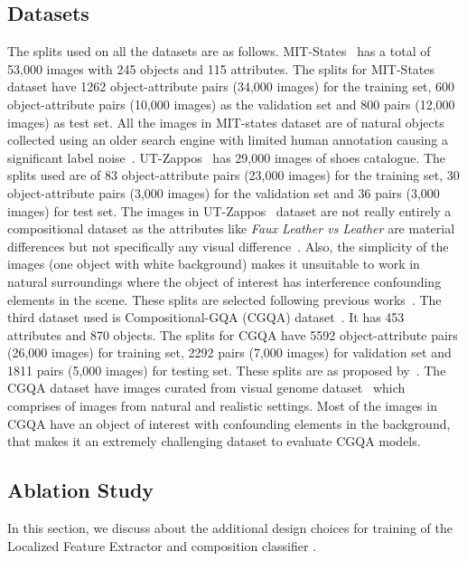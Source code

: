\documentclass{bmvc2k}
\begin{document}
\subsection{Datasets}
The splits used on all the datasets are as follows. MIT-States~\cite{isola2015discovering} has a total of 53,000 images with 245 objects and 115 attributes. The splits for MIT-States dataset have 1262 object-attribute pairs (34,000 images) for the training set, 600 object-attribute pairs (10,000 images) as the validation set and 800 pairs (12,000 images) as test set.  All the images in MIT-states dataset are of natural objects collected using an older search engine with limited human annotation causing a significant label noise~\cite{Atzmon_casual}.
UT-Zappos~\cite{yu2017semantic} has 29,000 images of shoes catalogue. The splits used are of 83 object-attribute pairs (23,000 images) for the training set, 30 object-attribute pairs (3,000 images) for the validation set and 36 pairs (3,000 images) for test set.  The images in UT-Zappos~\cite{yu2017semantic} dataset are not really entirely a compositional dataset as the attributes like \textit{Faux Leather vs Leather} are material differences but not specifically any visual difference~\cite{mancini2021learning}. Also, the simplicity of the images (one object with white background) makes it unsuitable to work in natural surroundings where the object of interest has interference confounding elements in the scene.  These splits are selected following previous works~\cite{purushwalkam2019task, mancini2021learning}.
The third dataset used is Compositional-GQA (CGQA) dataset~\cite{hudson2019gqa, naeem2021learning}. It has 453 attributes and 870 objects. The splits for CGQA have 5592 object-attribute pairs (26,000 images) for training set, 2292 pairs (7,000 images) for validation set and 1811 pairs (5,000 images) for testing set. These splits are as proposed by~\cite{mancini2021learning}. The CGQA dataset have images curated from visual genome dataset~\cite{krishna2017visual} which comprises of images from natural and realistic settings. Most of the images in CGQA have an object of interest with confounding elements in the background, that makes it an extremely challenging dataset to evaluate CGQA models. 

\subsection{Ablation Study}
In this section, we discuss about the additional design choices for training of the Localized Feature Extractor  and composition classifier .
\end{document}
